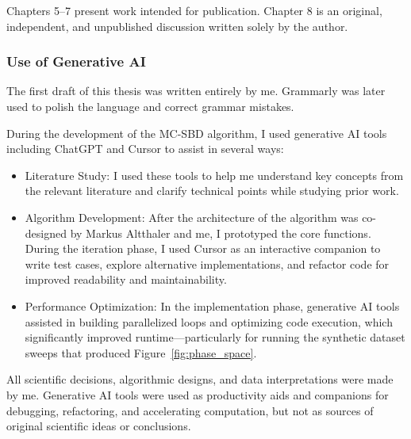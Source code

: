 Chapters 5–7 present work intended for publication. Chapter 8 is an original, independent, and unpublished discussion written solely by the author.
 

\subsubsection{Use of Generative AI}
The first draft of this thesis was written entirely by me. Grammarly was later used to polish the language and correct grammar mistakes. 

During the development of the \ac{MC-SBD} algorithm, I used generative AI tools including ChatGPT and Cursor to assist in several ways:
\begin{itemize}
	\item Literature Study: I used these tools to help me understand key concepts from the relevant literature and clarify technical points while studying prior work.
	\item Algorithm Development: After the architecture of the algorithm was co-designed by Markus Altthaler and me, I prototyped the core functions. During the iteration phase, I used Cursor as an interactive companion to write test cases, explore alternative implementations, and refactor code for improved readability and maintainability.
	\item Performance Optimization: In the implementation phase, generative AI tools assisted in building parallelized loops and optimizing code execution, which significantly improved runtime—particularly for running the synthetic dataset sweeps that produced Figure~\ref{fig:phase_space}.
\end{itemize}
All scientific decisions, algorithmic designs, and data interpretations were made by me. Generative AI tools were used as productivity aids and companions for debugging, refactoring, and accelerating computation, but not as sources of original scientific ideas or conclusions.
